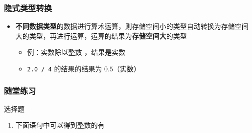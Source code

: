 \begin{frame}[fragile]
    \frametitle{隐式类型转换}

    \begin{itemize}[<+->]
        \item \textbf{不同数据类型}的数据进行算术运算，则存储空间小的类型自动转换为存储空间大的类型，再进行运算，运算的结果为\textbf{存储空间大}的类型

            \begin{itemize}
                \item 例：实数除以整数 ，结果是实数
                \item \lstinline|2.0 / 4| 的结果的结果为 $0.5$（实数）
            \end{itemize}

    \end{itemize}
\end{frame}

\begin{frame}[fragile]
    \frametitle{随堂练习}

    \begin{exampleblock}{选择题}

        \begin{enumerate}
            \item 下面语句中可以得到整数的有


        \end{enumerate}

    \end{exampleblock}
\end{frame}


